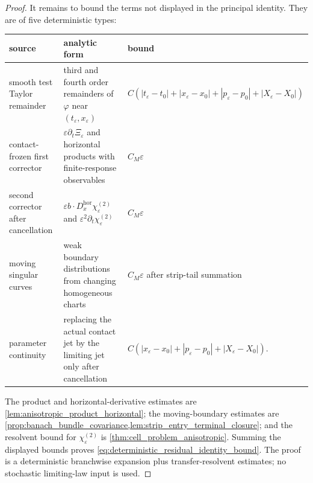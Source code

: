 \documentclass[12pt, letterpaper]{amsart}
\newcommand{\Hor}{\mathrm{hor}}
\theoremstyle{plain}
\theoremstyle{definition}
\theoremstyle{remark}
\begin{document}
\begin{proof}
It remains to bound the terms not displayed in the principal identity.  They are
of five deterministic types:
\begin{center}
\small
\begin{tabular}{L{0.27\textwidth}|L{0.34\textwidth}|L{0.23\textwidth}}
source & analytic form & bound \\
\hline
smooth test Taylor remainder & third and fourth order remainders of
$\varphi$ near $(t_\varepsilon,x_\varepsilon)$ &
$C(|t_\varepsilon-t_0|+|x_\varepsilon-x_0|+|p_\varepsilon-p_0|+|X_\varepsilon-X_0|)$ \\
contact-frozen first corrector &
$\varepsilon\partial_t\Xi_\varepsilon$ and horizontal products with finite-response observables & $C_M\varepsilon$ \\
second corrector after cancellation &
$\varepsilon b\cdot D_x^{\Hor}\chi_\varepsilon^{(2)}$ and
$\varepsilon^2\partial_t\chi_\varepsilon^{(2)}$ & $C_M\varepsilon$ \\
moving singular curves & weak boundary distributions from changing homogeneous charts & $C_M\varepsilon$ after strip-tail summation \\
parameter continuity & replacing the actual contact jet by the limiting jet only after cancellation &
$C(|x_\varepsilon-x_0|+|p_\varepsilon-p_0|+|X_\varepsilon-X_0|)$.
\end{tabular}
\end{center}
The product and horizontal-derivative estimates are
\cref{lem:anisotropic_product_horizontal}; the moving-boundary estimates are
\cref{prop:banach_bundle_covariance,lem:strip_entry_terminal_closure}; and the
resolvent bound for $\chi_\varepsilon^{(2)}$ is
\cref{thm:cell_problem_anisotropic}.  Summing the displayed bounds proves
\eqref{eq:deterministic_residual_identity_bound}.  The proof is a deterministic
branchwise expansion plus transfer-resolvent estimates; no stochastic limiting-law input is used.
\end{proof}
\end{document}
